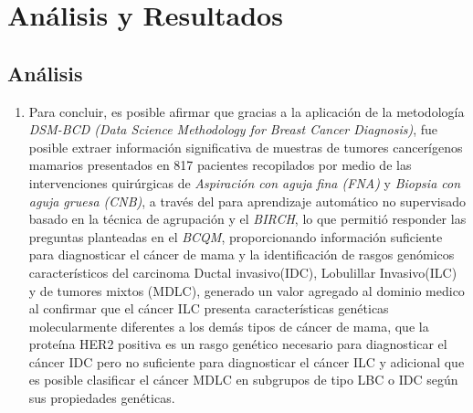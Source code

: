 \chapter{Análisis y Resultados}

\section{Análisis}
\begin{enumerate}[label=\HandPencilLeft]
	\item Para concluir, es posible afirmar que gracias a la aplicación de la metodología \textit{DSM-BCD (Data Science Methodology for Breast Cancer Diagnosis)}, fue posible extraer información significativa de muestras de tumores cancerígenos mamarios presentados en 817 pacientes recopilados por medio de las intervenciones quirúrgicas de \textit{Aspiración con aguja fina (FNA)} y \textit{Biopsia con aguja gruesa (CNB)}, a través del para aprendizaje automático no supervisado basado en la técnica de agrupación y el \textit{BIRCH}, lo que permitió responder las preguntas planteadas en el \textit{BCQM}, proporcionando información suficiente para diagnosticar el cáncer de mama y la identificación de  rasgos genómicos característicos del carcinoma Ductal invasivo(IDC), Lobulillar Invasivo(ILC) y de tumores mixtos (MDLC), generado un valor agregado al dominio medico al confirmar que el cáncer ILC presenta características genéticas molecularmente diferentes a los demás tipos de cáncer de mama, que  la proteína HER2 positiva es un rasgo genético necesario para diagnosticar el cáncer IDC pero no suficiente para diagnosticar el cáncer ILC y adicional que es posible clasificar el cáncer MDLC en subgrupos de tipo LBC o IDC según sus propiedades genéticas.
\end{enumerate}

\newpage
